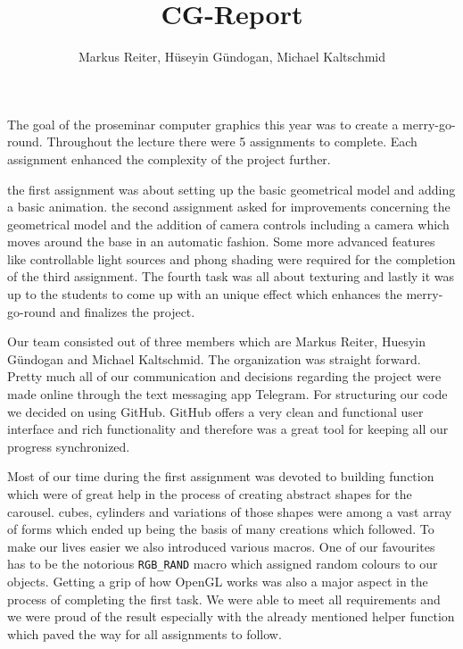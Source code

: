 \documentclass{report}
\title{CG-Report}
\author{Markus Reiter, Hüseyin Gündogan, Michael Kaltschmid}
\begin{document}
\maketitle

The goal of the proseminar computer graphics this year was to create a merry-go-round.  
Throughout the lecture there were 5 assignments to complete. Each assignment enhanced the complexity of the project further. 
\par
the first assignment was about setting up the basic geometrical model and adding a basic animation. the second assignment asked for improvements concerning the geometrical model and the addition of camera controls including a camera which moves around the base in an automatic fashion. Some more advanced features like controllable light sources and phong shading were required for the completion of the third assignment. The fourth task was all about texturing and lastly it was up to the students to come up with an unique effect which enhances the merry-go-round and finalizes the project.
\par
Our team consisted out of three members which are Markus Reiter, Huesyin Gündogan and Michael Kaltschmid. The organization was straight forward. Pretty much all of our communication and decisions regarding the project were made online through the text messaging app Telegram. For structuring our code we decided on using GitHub. GitHub offers a very clean and functional user interface and rich functionality and therefore was a great tool for keeping all our progress synchronized. 
\par
Most of our time during the first assignment was devoted to building function which were of great help in the process of creating abstract shapes for the carousel. cubes, cylinders and variations of those shapes were among a vast array of forms which ended up being the basis of many creations which followed. To make our lives easier we also introduced various macros. One of our favourites has to be the notorious \texttt{RGB\_RAND} macro which assigned random colours to our objects. Getting a grip of how OpenGL works was also a major aspect in the process of completing the first task. We were able to meet all requirements and we were proud of the result especially with the already mentioned helper function which paved the way for all assignments to follow.
\par
\end{document}
